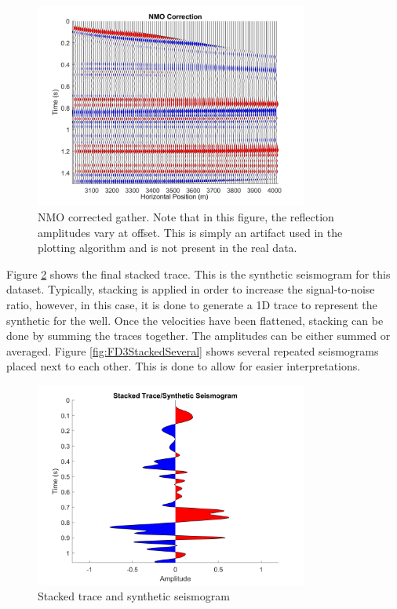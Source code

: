 \documentclass[12pt]{article}
\begin{document}
\begin{figure}[!htb]
	\centering
	\includegraphics[width=0.8\textwidth]{Figures/FD3NMOCorrection.png}
	\caption[Finite-difference 3-layer NMO correction]{NMO corrected gather. Note that in this figure, the reflection amplitudes vary at offset. This is simply an artifact used in the plotting algorithm and is not present in the real data.}
	\label{fig:FD3NMO}
\end{figure}	
	
	Figure \ref{fig:FD3Stacked} shows the final stacked trace. This is the synthetic seismogram for this dataset. Typically, stacking is applied in order to increase the signal-to-noise ratio, however, in this case, it is done to generate a 1D trace to represent the synthetic for the well. Once the velocities have been flattened, stacking can be done by summing the traces together. The amplitudes can be either summed or averaged. Figure \ref{fig:FD3StackedSeveral} shows several repeated seismograms placed next to each other. This is done to allow for easier interpretations. 

\begin{figure}[!htb]
	\centering
	\includegraphics[width=0.8\textwidth]{Figures/FD3StackedTrace.png}
	\caption[Finite-difference 3-layer synthetic seismogram]{Stacked trace and synthetic seismogram}
	\label{fig:FD3Stacked}
\end{figure}
\end{document}
